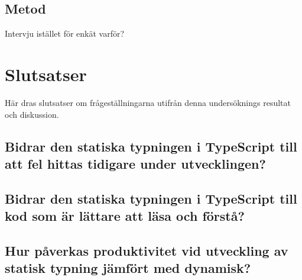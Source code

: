 \subsection{Metod}
Intervju istället för enkät varför?
\section{Slutsatser}
Här dras slutsatser om frågeställningarna utifrån denna undersöknings resultat och diskussion.
\subsection{Bidrar den statiska typningen i TypeScript till att fel hittas tidigare under utvecklingen?}
\subsection{Bidrar den statiska typningen i TypeScript till kod som är lättare att läsa och förstå?}
\subsection{Hur påverkas produktivitet vid utveckling av statisk typning jämfört med dynamisk?}



